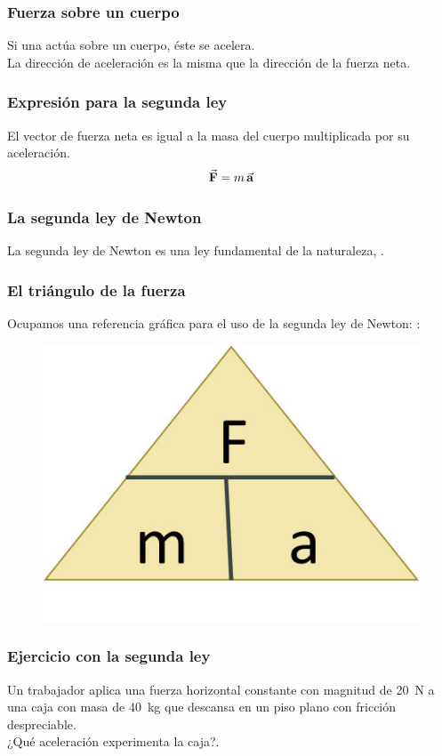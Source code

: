 \documentclass[14pt]{beamer}
\begin{document}
\begin{frame}
\frametitle{Fuerza sobre un cuerpo}
Si una  actúa sobre un cuerpo, éste se acelera.
\\
\bigskip
\pause
La dirección de aceleración es la misma que la dirección de la fuerza neta. 
\end{frame}
\begin{frame}
\frametitle{Expresión para la segunda ley}
El vector de fuerza neta es igual a la masa del cuerpo multiplicada por su aceleración.
\pause
\begin{align*}
\va{F} = m \, \va{a}
\end{align*}
\end{frame}
\begin{frame}
\frametitle{La segunda ley de Newton}
La segunda ley de Newton es una ley fundamental de la naturaleza, \pause {}.
\end{frame}
\begin{frame}
\frametitle{El triángulo de la fuerza}
Ocupamos una referencia gráfica para el uso de la segunda ley de Newton: \pause {}:
\pause
\begin{figure}
\includegraphics[scale=1]{Imagenes/Newton_11.jpg}
\end{figure}
\end{frame}
\begin{frame}
\frametitle{Ejercicio con la segunda ley}
Un trabajador aplica una fuerza horizontal constante con magnitud de \SI{20}{\newton} a una caja con masa de \SI{40}{\kilo\gram} que descansa en un piso plano con fricción despreciable.
\\
\bigskip
\pause
¿Qué aceleración experimenta la caja?.
\end{frame}
\end{document}
